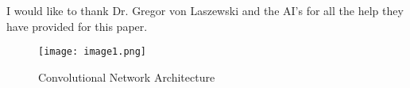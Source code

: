 \documentclass[sigconf]{acmart}
\begin{document}
\begin{acks}
I would like to thank Dr. Gregor von Laszewski and the AI's for all the help they have provided for this paper.

\end{acks}


 

\begin{figure}[htp]
    \texttt{[image: image1.png]}
    \caption{Convolutional Network Architecture \cite{google}}
    \label{fig:figure1}
\end{figure}
\end{document}
